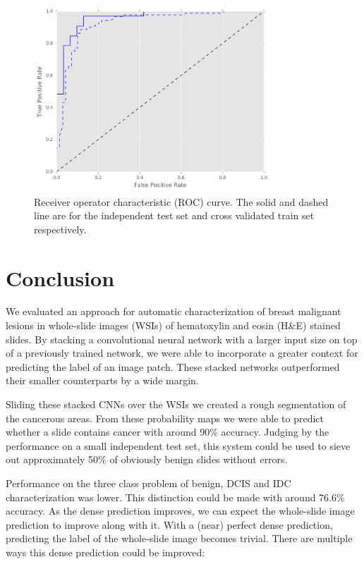 \documentclass[journal]{IEEEtran}
\begin{document}
\begin{figure}[!t]
\centering{}
\hspace{-0.3cm}\includegraphics[width=3.5in]{roc}
\vspace{-0.35cm}\caption{Receiver operator characteristic (ROC) curve. The solid and dashed line are for the independent test set and cross validated train set respectively.}
\label{fig_roc}
\end{figure}

\section{Conclusion}

We evaluated an approach for automatic characterization of breast malignant lesions in whole-slide images (WSIs) of hematoxylin and eosin (H\&E) stained slides. By stacking a convolutional neural network with a larger input size on top of a previously trained network, we were able to incorporate a greater context for predicting the label of an image patch. These stacked networks outperformed their smaller counterparts by a wide margin. 

Sliding these stacked CNNs over the WSIs we created a rough segmentation of the cancerous areas. From these probability maps we were able to predict whether a slide contains cancer with around 90\% accuracy. Judging by the performance on a small independent test set, this system could be used to sieve out approximately 50\% of obviously benign slides without errors. 

Performance on the three class problem of benign, DCIS and IDC characterization was lower. This distinction could be made with around 76.6\% accuracy. As the dense prediction improves, we can expect the whole-slide image prediction to improve along with it. With a (near) perfect dense prediction, predicting the label of the whole-slide image becomes trivial. There are multiple ways this dense prediction could be improved:
\end{document}
